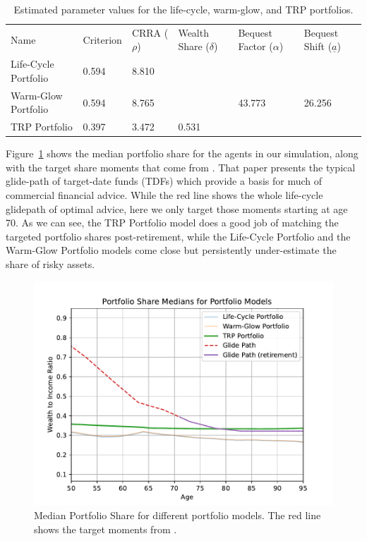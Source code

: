 \documentclass{article}
\newcommand{\CRRA}{\rho}
\begin{document}
\begin{table}
\centering
\caption[]{Estimated parameter values for the life-cycle, warm-glow, and TRP portfolios.}
\label{parameters}
\begin{tabular}{p{}p{}p{}p{}p{}p{}}
\toprule
Name & Criterion & CRRA ($\CRRA$) & Wealth Share ($\delta$) & Bequest Factor ($\alpha$) & Bequest Shift ($\underline{a}$) \\
Life-Cycle Portfolio & 0.594 & 8.810 &  &  &  \\
Warm-Glow Portfolio & 0.594 & 8.765 &  & 43.773 & 26.256 \\
TRP Portfolio & 0.397 & 3.472 & 0.531 &  &  \\
\bottomrule
\end{tabular}
\end{table}

Figure~\ref{medshare} shows the median portfolio share for the agents in our simulation, along with the target share moments that come from \cite{Aboagye2024}. That paper presents the typical glide-path of target-date funds (TDFs) which provide a basis for much of commercial financial advice. While the red line shows the whole life-cycle glidepath of optimal advice, here we only target those moments starting at age 70. As we can see, the TRP Portfolio model does a good job of matching the targeted portfolio shares post-retirement, while the Life-Cycle Portfolio and the Warm-Glow Portfolio models come close but persistently under-estimate the share of risky assets.

\begin{figure}[!htbp]
\centering
\includegraphics[width=0.7\linewidth]{files/median_share-4914e6ae678815fe96333c65f71d7d38.pdf}
\caption[]{Median Portfolio Share for different portfolio models. The red line shows the target moments from \cite{Aboagye2024}.}
\label{medshare}
\end{figure}
\end{document}
